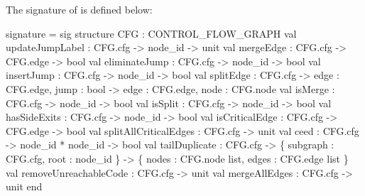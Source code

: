 The signature of  is defined below:
\begin{SML}
 signature  = sig
    structure CFG : CONTROL_FLOW_GRAPH
    val updateJumpLabel : CFG.cfg -> node_id -> unit
    val mergeEdge       : CFG.cfg -> CFG.edge -> bool
    val eliminateJump   : CFG.cfg -> node_id -> bool
    val insertJump      : CFG.cfg -> node_id -> bool
    val splitEdge  : CFG.cfg -> { edge : CFG.edge, jump : bool }
                      -> { edge : CFG.edge, node : CFG.node }
    val isMerge        : CFG.cfg -> node_id -> bool
    val isSplit        : CFG.cfg -> node_id -> bool
    val hasSideExits   : CFG.cfg -> node_id -> bool
    val isCriticalEdge : CFG.cfg -> CFG.edge -> bool
    val splitAllCriticalEdges : CFG.cfg -> unit
    val ceed : CFG.cfg -> node_id * node_id -> bool
    val tailDuplicate : CFG.cfg -> \{ subgraph : CFG.cfg, root : node_id \} 
                                -> \{ nodes : CFG.node list, 
                                     edges : CFG.edge list \} 
    val removeUnreachableCode : CFG.cfg -> unit
    val mergeAllEdges : CFG.cfg -> unit
 end
\end{SML}


